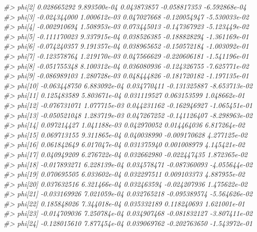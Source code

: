\documentclass[
]{article}
\newenvironment{Shaded}{\begin{snugshade}}{\end{snugshade}}
\newcommand{\CommentTok}[1]{\textcolor[rgb]{0.56,0.35,0.01}{\textit{#1}}}
\begin{document}
\begin{Shaded}
\begin{Highlighting}[]
\CommentTok{\#\textgreater{} phi[2]        0.028665292 9.893500e{-}04 0.043873857  {-}0.058817353 {-}6.592868e{-}04}
\CommentTok{\#\textgreater{} phi[3]       {-}0.024344000 1.000612e{-}03 0.047027668  {-}0.120054947 {-}5.530033e{-}02}
\CommentTok{\#\textgreater{} phi[4]       {-}0.002910694 1.508953e{-}03 0.073445013  {-}0.147367923 {-}5.123449e{-}02}
\CommentTok{\#\textgreater{} phi[5]       {-}0.111170023 9.337915e{-}04 0.038526385  {-}0.188828294 {-}1.361169e{-}01}
\CommentTok{\#\textgreater{} phi[6]       {-}0.074240357 9.191357e{-}04 0.038965652  {-}0.150572184 {-}1.003092e{-}01}
\CommentTok{\#\textgreater{} phi[7]       {-}0.123578764 1.219170e{-}03 0.047566629  {-}0.220606181 {-}1.541196e{-}01}
\CommentTok{\#\textgreater{} phi[8]       {-}0.051755348 8.100312e{-}04 0.036080936  {-}0.124326755 {-}7.625771e{-}02}
\CommentTok{\#\textgreater{} phi[9]       {-}0.086989103 1.280728e{-}03 0.048444826  {-}0.181720182 {-}1.197135e{-}01}
\CommentTok{\#\textgreater{} phi[10]      {-}0.063448750 6.883092e{-}04 0.034770411  {-}0.131325887 {-}8.653713e{-}02}
\CommentTok{\#\textgreater{} phi[11]       0.125483589 5.803671e{-}04 0.031119527   0.063153599  1.048662e{-}01}
\CommentTok{\#\textgreater{} phi[12]      {-}0.076731071 1.077715e{-}03 0.044231162  {-}0.162946927 {-}1.065451e{-}01}
\CommentTok{\#\textgreater{} phi[13]      {-}0.050521048 1.283719e{-}03 0.047267252  {-}0.141126407 {-}8.298963e{-}02}
\CommentTok{\#\textgreater{} phi[14]       0.097214427 1.041188e{-}03 0.042970052   0.014464036  6.817264e{-}02}
\CommentTok{\#\textgreater{} phi[15]       0.069713155 9.311865e{-}04 0.040038990  {-}0.009170628  4.277125e{-}02}
\CommentTok{\#\textgreater{} phi[16]       0.061842649 6.017047e{-}04 0.031375940   0.001008979  4.145421e{-}02}
\CommentTok{\#\textgreater{} phi[17]       0.040949209 6.276722e{-}04 0.032662980  {-}0.022447435  1.872365e{-}02}
\CommentTok{\#\textgreater{} phi[18]      {-}0.017893271 6.228139e{-}04 0.034578471  {-}0.087360093 {-}4.055644e{-}02}
\CommentTok{\#\textgreater{} phi[19]       0.070695505 6.033602e{-}04 0.032297511   0.009103373  4.887955e{-}02}
\CommentTok{\#\textgreater{} phi[20]       0.037632516 6.321466e{-}04 0.032463594  {-}0.024207936  1.475622e{-}02}
\CommentTok{\#\textgreater{} phi[21]      {-}0.033169926 7.021059e{-}04 0.032765218  {-}0.095389574 {-}5.564626e{-}02}
\CommentTok{\#\textgreater{} phi[22]       0.185848026 7.344018e{-}04 0.035332189   0.118240693  1.621001e{-}01}
\CommentTok{\#\textgreater{} phi[23]      {-}0.014709036 7.250784e{-}04 0.034907468  {-}0.081832127 {-}3.807411e{-}02}
\CommentTok{\#\textgreater{} phi[24]      {-}0.128015610 7.877454e{-}04 0.039069762  {-}0.202763650 {-}1.543972e{-}01}

\end{Highlighting}
\end{Shaded}
\end{document}
